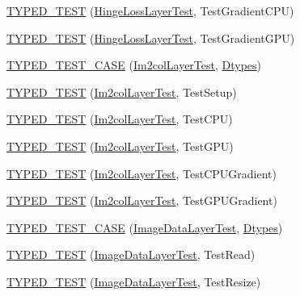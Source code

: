 \begin{DoxyCompactItemize}
\hyperlink{namespacecaffe_a1a5c4461f2583711861bf2add5198ad8}{T\+Y\+P\+E\+D\+\_\+\+T\+E\+S\+T} (\hyperlink{classcaffe_1_1_hinge_loss_layer_test}{Hinge\+Loss\+Layer\+Test}, Test\+Gradient\+C\+P\+U)
\item 
\hyperlink{namespacecaffe_a37677c9ba73a947521cb4288781d399b}{T\+Y\+P\+E\+D\+\_\+\+T\+E\+S\+T} (\hyperlink{classcaffe_1_1_hinge_loss_layer_test}{Hinge\+Loss\+Layer\+Test}, Test\+Gradient\+G\+P\+U)
\item 
\hyperlink{namespacecaffe_ac9c2a049bb73ab7853f4818a785d5fee}{T\+Y\+P\+E\+D\+\_\+\+T\+E\+S\+T\+\_\+\+C\+A\+S\+E} (\hyperlink{classcaffe_1_1_im2col_layer_test}{Im2col\+Layer\+Test}, \hyperlink{namespacecaffe_a131dc2be50f2f10e18450da61cde6b57}{Dtypes})
\item 
\hyperlink{namespacecaffe_a4f4ebba3b894fd6d7e4b47d9af62b69e}{T\+Y\+P\+E\+D\+\_\+\+T\+E\+S\+T} (\hyperlink{classcaffe_1_1_im2col_layer_test}{Im2col\+Layer\+Test}, Test\+Setup)
\item 
\hyperlink{namespacecaffe_adbfec27472ada1542d0bf127b53fdb48}{T\+Y\+P\+E\+D\+\_\+\+T\+E\+S\+T} (\hyperlink{classcaffe_1_1_im2col_layer_test}{Im2col\+Layer\+Test}, Test\+C\+P\+U)
\item 
\hyperlink{namespacecaffe_aac8296f7c5216a0a39b8558521e4c469}{T\+Y\+P\+E\+D\+\_\+\+T\+E\+S\+T} (\hyperlink{classcaffe_1_1_im2col_layer_test}{Im2col\+Layer\+Test}, Test\+G\+P\+U)
\item 
\hyperlink{namespacecaffe_a4856381e52c6c20672673dc369ef2c07}{T\+Y\+P\+E\+D\+\_\+\+T\+E\+S\+T} (\hyperlink{classcaffe_1_1_im2col_layer_test}{Im2col\+Layer\+Test}, Test\+C\+P\+U\+Gradient)
\item 
\hyperlink{namespacecaffe_a3bedb77efde35e4171d8de355805a739}{T\+Y\+P\+E\+D\+\_\+\+T\+E\+S\+T} (\hyperlink{classcaffe_1_1_im2col_layer_test}{Im2col\+Layer\+Test}, Test\+G\+P\+U\+Gradient)
\item 
\hyperlink{namespacecaffe_ab92b9bbe36d0634c68ff86dc83e3fb71}{T\+Y\+P\+E\+D\+\_\+\+T\+E\+S\+T\+\_\+\+C\+A\+S\+E} (\hyperlink{classcaffe_1_1_image_data_layer_test}{Image\+Data\+Layer\+Test}, \hyperlink{namespacecaffe_a131dc2be50f2f10e18450da61cde6b57}{Dtypes})
\item 
\hyperlink{namespacecaffe_ab70b39138b77aa9f64fd59c0cf202b3f}{T\+Y\+P\+E\+D\+\_\+\+T\+E\+S\+T} (\hyperlink{classcaffe_1_1_image_data_layer_test}{Image\+Data\+Layer\+Test}, Test\+Read)
\item 
\hyperlink{namespacecaffe_a66d82dc8bd157996c7c2cc56c36f96d0}{T\+Y\+P\+E\+D\+\_\+\+T\+E\+S\+T} (\hyperlink{classcaffe_1_1_image_data_layer_test}{Image\+Data\+Layer\+Test}, Test\+Resize)

\end{DoxyCompactItemize}
